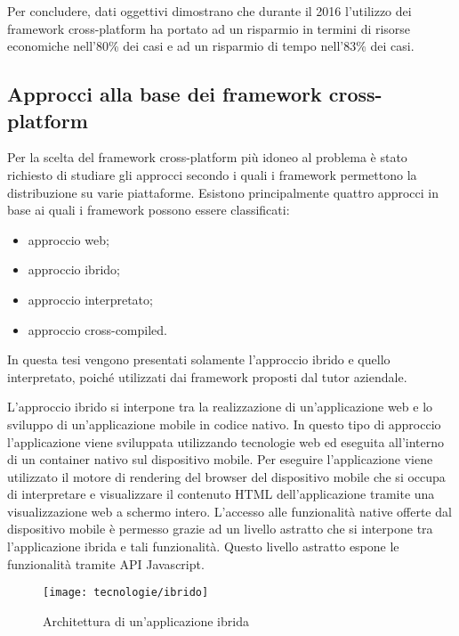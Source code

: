 Per concludere, dati oggettivi dimostrano che durante il 2016 l'utilizzo dei framework cross-platform ha portato ad un risparmio in termini di risorse economiche nell'80\% dei casi e ad un risparmio di tempo nell'83\% dei casi.

\subsection{Approcci alla base dei framework cross-platform}

Per la scelta del framework cross-platform più idoneo al problema è stato richiesto di studiare gli approcci secondo i quali i framework permettono la distribuzione su varie piattaforme. Esistono principalmente quattro approcci in base ai quali i framework possono essere classificati:
\begin{itemize}
	\item approccio web;
	\item approccio ibrido;
	\item approccio interpretato;
	\item approccio cross-compiled.
\end{itemize}

In questa tesi vengono presentati solamente l'approccio ibrido e quello interpretato, poiché utilizzati dai framework proposti dal tutor aziendale.

L'approccio ibrido si interpone tra la realizzazione di un'applicazione web e lo sviluppo di un'applicazione mobile in codice nativo. In questo tipo di approccio l'applicazione viene sviluppata utilizzando tecnologie web ed eseguita all'interno di un container nativo sul dispositivo mobile. Per eseguire l'applicazione viene utilizzato il motore di rendering del browser del dispositivo mobile che si occupa di interpretare e visualizzare il contenuto HTML dell'applicazione tramite una visualizzazione web a schermo intero. L'accesso alle funzionalità native offerte dal dispositivo mobile è permesso grazie ad un livello astratto che si interpone tra l'applicazione ibrida e tali funzionalità. Questo livello astratto espone le funzionalità tramite API Javascript. 

\begin{figure}[!h] 
    \centering 
    \texttt{[image: tecnologie/ibrido]} 
    \caption{Architettura di un'applicazione ibrida}
\end{figure}

